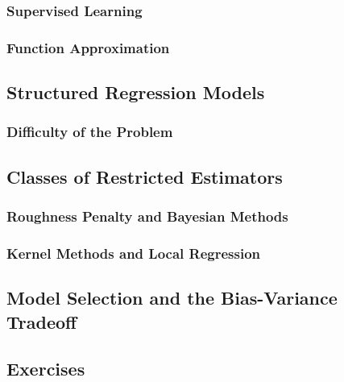 \subsubsection{Supervised Learning}
\subsubsection{Function Approximation}

\subsection{Structured Regression Models}
\subsubsection{Difficulty of the Problem}
\subsection{Classes of Restricted Estimators}
\subsubsection{Roughness Penalty and Bayesian Methods}
\subsubsection{Kernel Methods and Local Regression}
\subsection{Model Selection and the Bias-Variance Tradeoff}


\subsection{Exercises}
